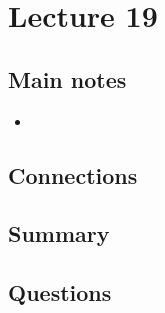 \section{Lecture 19}
\subsection{Main notes}


\begin{itemize}
	\item
\end{itemize}


\subsection{Connections}


\subsection{Summary}


\subsection{Questions}
